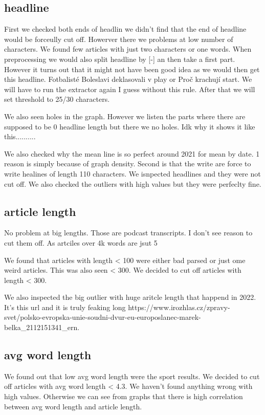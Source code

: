 \documentclass{article}
\begin{document}
    \subsection{headline}
    First we checked both ends of headlin we didn't find that the end of headline would be forceully cut off.
    Howerver there we problems at low number of characters. We found few articles with just two characters or one words.
    When preprocessing we would also split headline by [-] an then take a first part. However it turns out that it might not
    have been good idea as we would then get this headline. Fotbalisté Boleslavi deklasovali v play or Proč krachují start.
    We will have to run the extractor again I guess without this rule. After that we will set threshold to 25/30 characters.

    We also seen holes in the graph. However we listen the parts where there are supposed to be 0 headline length but there we no holes.
    Idk why it shows it like this..........

    We also checked why the mean line is so perfect around 2021 for mean by date.
    1 reason is simply because of graph density. Second is that the write are force to write healines of length 110 characters. We isnpected headlines and they were not cut off.
    We also checked the outliers with high values but they were perfeclty fine.

    \subsection{article length}
    No problem at big lengths. Those are podcast transcripts. I don't see reason to cut them off. As artciles over 4k words are jsut 5%

    We found that articles with length < 100 were either bad parsed or just ome weird articles.
    This was also seen < 300. We decided to cut off articles with length < 300.

    We also inspected the big outlier with huge aritcle length that happend in 2022. It's this url and it is truly feaking long https://www.irozhlas.cz/zpravy-svet/polsko-evropska-unie-soudni-dvur-eu-europoslanec-marek-belka_2112151341_ern.


    \subsection{avg word length}
    We found out that low avg word length were the sport results. We decided to cut off articles with avg word length < 4.3. We haven't found anything wrong with high values. Otherwise we can see from graphs that there is high correlation between avg word length and article length.
\end{document}
